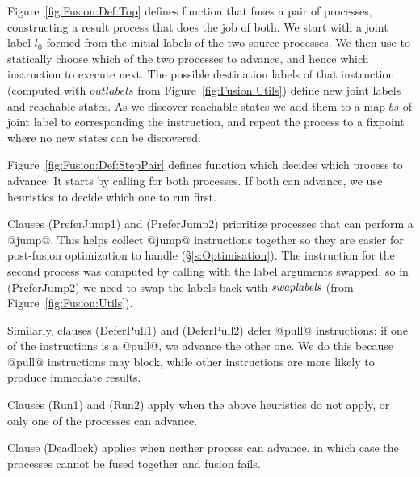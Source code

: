 



\smallskip
Figure~\ref{fig:Fusion:Def:Top} defines function  that fuses a pair of processes, constructing a result process that does the job of both. We start with a joint label $l_0$ formed from the initial labels of the two source processes. We then use  to statically choose which of the two processes to advance, and hence which instruction to execute next. The possible destination labels of that instruction (computed with $outlabels$ from Figure~\ref{fig:Fusion:Utils}) define new joint labels and reachable states. As we discover reachable states we add them to a map $bs$ of joint label to corresponding the instruction, and repeat the process to a fixpoint where no new states can be discovered.




Figure~\ref{fig:Fusion:Def:StepPair} defines function  which decides which process to advance. It starts by calling  for both processes. If both can advance, we use heuristics to decide which one to run first.

Clauses (PreferJump1) and (PreferJump2) prioritize processes that can perform a @jump@. This helps collect @jump@ instructions together so they are easier for post-fusion optimization to handle (\S\ref{s:Optimisation}).
The instruction for the second process was computed by calling  with the label arguments swapped, so in (PreferJump2) we need to swap the labels back with $\textit{swaplabels}$ (from Figure~\ref{fig:Fusion:Utils}).

Similarly, clauses (DeferPull1) and (DeferPull2) defer @pull@ instructions: if one of the instructions is a @pull@, we advance the other one. We do this because @pull@ instructions may block, while other instructions are more likely to produce immediate results.

Clauses (Run1) and (Run2) apply when the above heuristics do not apply, or only one of the processes can advance.

Clause (Deadlock) applies when neither process can advance, in which case the processes cannot be fused together and fusion fails.

